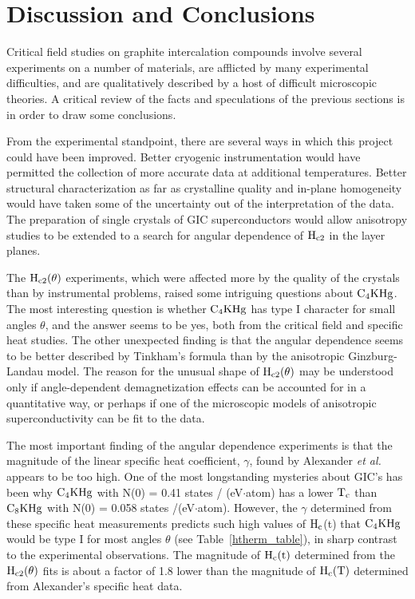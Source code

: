 \section{Discussion and Conclusions}
\label{critfdisc}

        Critical field  studies on graphite intercalation compounds involve
several  experiments  on  a number  of  materials,  are afflicted  by  many
experimental  difficulties, and are qualitatively described   by  a host of
difficult   microscopic theories.  A   critical  review  of  the  facts and
speculations of the previous sections is in order to draw some conclusions.

        From the  experimental standpoint, there are  several ways in which
this  project could  have been improved.   Better cryogenic instrumentation
would have permitted  the collection  of more  accurate data  at additional
temperatures.   Better  structural  characterization as  far as crystalline
quality  and in-plane homogeneity would  have taken some of the uncertainty
out of the interpretation of the data.   The preparation of single crystals
of GIC superconductors  would allow anisotropy studies  to be extended to a
search for angular dependence of $\rm H_{c2}$ in the layer planes.

        The $\rm H_{c2}(\theta)$ experiments,  which were affected  more by
the  quality of the  crystals  than by  instrumental  problems, raised some
intriguing questions about $\rm C_4KHg$.  The most  interesting question is
whether $\rm C_4KHg$ has  type I character  for small  angles $\theta$, and
the answer seems to be yes, both from the critical  field and specific heat
studies.  The other unexpected finding is that the angular dependence seems
to be  better   described by   Tinkham's  formula  than  by the anisotropic
Ginzburg-Landau  model.   The  reason  for    the  unusual  shape  of  $\rm
H_{c2}(\theta)$ may be  understood only if  angle-dependent demagnetization
effects can be accounted for in  a quantitative  way, or perhaps if  one of
the microscopic models  of anisotropic superconductivity can  be fit to the
data.

        The most important finding of the angular dependence experiments is
that the magnitude of the linear specific heat coefficient, $\gamma$, found
by  Alexander {\em  et al.\/}  appears  to be  too  high.   One of the most
longstanding mysteries about  GIC's has been why $\rm  C_4KHg$  with N(0) =
0.41 states / (eV$\cdot$atom) has a lower $\rm  T_c$ than $\rm C_8KHg$ with
N(0)  =   0.058    states /(eV$\cdot$atom).\cite{alexander81}  However, the
$\gamma$  determined from  these specific  heat  measurements predicts such
high  values of  $\rm H_c$(t)  that $\rm C_4KHg$  would  be type I for most
angles  $\theta$ (see Table~\ref{htherm_table}),  in sharp contrast  to the
experimental observations.  The  magnitude of $\rm  H_c(t)$ determined from
the  $\rm H_{c2}(\theta)$  fits is about  a factor   of 1.8  lower than the
magnitude of $\rm H_{c}(T)$ determined from Alexander's specific heat data.

